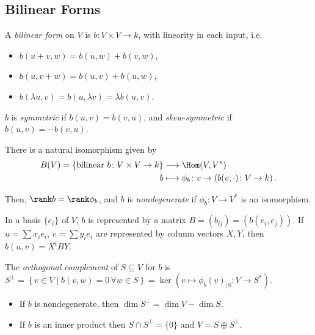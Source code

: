 \documentclass{notes}
\begin{document}
\subsection{Bilinear Forms}

\begin{defn}
    A \emph{bilinear form} on $V$ is $b\colon V\times V \to k $, with linearity in each input, i.e.
    \begin{itemize}
        \item $b(u+v,w)=b(u,w)+b(v,w)$,
        \item $b(u,v+w)=b(u,v)+b(u,w)$,
        \item $b(\lambda u,v)=b(u,\lambda v)=\lambda b(u,v)$.
    \end{itemize}
    
    $b$ is \emph{symmetric} if $b(u,v)=b(v,u)$, and  \emph{skew-symmetric} if $b(u,v)=-b(v,u)$.
\end{defn}

\begin{theorem}
    There is a natural isomorphism given by
    \begin{align*}
        B(V)=\left\{ \text{bilinear } b\colon V\times V \to k  \right\} &\longrightarrow \Hom (V,V^{*}) \\
        b &\longmapsto \phi _b\colon v \to \left( b(v,\cdot )\colon V \to k  \right)  
    .\end{align*}

    Then, $\rank b=\rank \phi _b$, and $b$ is \emph{nondegenerate} if $\phi _b\colon V \to V^* $ is an isomorphism.
\end{theorem}

\begin{fact}
    In a basis $\{e_i\}$ of $V$, $b$  is represented by a matrix $B=(b_{ij})=(b(e_i,e_j))$.
    If $u=\sum x_ie_i$, $v=\sum y_ie_i$ are represented by column vectors $X,Y$, then $b(u,v) = X^t B Y $.
\end{fact}

\begin{defn}
    The  \emph{orthogonal complement} of $S\subseteq V$ for $b$ is $S^{\perp}=\left\{ v\in V\mid  b(v,w)=0\,\forall w\in S \right\} =\ker (v\mapsto \phi _b(v)_{|S}\colon V\to S^{*})$.
\end{defn}

\begin{theorem}
    \begin{itemize}
        \item If $b$ is nondegenerate, then $\dim S^{\perp}=\dim  V-\dim S$.
        \item If $b$ is an inner product then $S\cap S^{\perp}=\{0\}$ and $V=S\oplus S^{\perp}$.
    \end{itemize}
\end{theorem}
\end{document}
